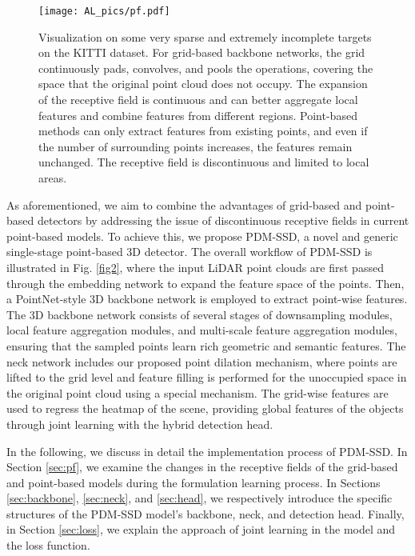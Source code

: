 \begin{figure}[t]
	\begin{center}
		\texttt{[image: AL\_pics/pf.pdf]}
	\end{center}
	\vspace{-0.3cm}
	\caption{Visualization on some very sparse and extremely incomplete targets on the KITTI dataset. For grid-based backbone networks, the grid continuously pads, convolves, and pools the operations, covering the space that the original point cloud does not occupy. The expansion of the receptive field is continuous and can better aggregate local features and combine features from different regions. Point-based methods can only extract features from existing points, and even if the number of surrounding points increases, the features remain unchanged. The receptive field is discontinuous and limited to local areas.}
	\label{fig3}
	\vspace{-0.3cm}
\end{figure}

As aforementioned, we aim to combine the advantages of grid-based and point-based detectors by addressing the issue of discontinuous receptive fields in current point-based models. To achieve this, we propose PDM-SSD, a novel and generic single-stage point-based 3D detector. The overall workflow of PDM-SSD is illustrated in Fig. \ref{fig2}, where the input LiDAR point clouds are first passed through the embedding network to expand the feature space of the points. Then, a PointNet-style 3D backbone network is employed to extract point-wise features. The 3D backbone network consists of several stages of downsampling modules, local feature aggregation modules, and multi-scale feature aggregation modules, ensuring that the sampled points learn rich geometric and semantic features. The neck network includes our proposed point dilation mechanism, where points are lifted to the grid level and feature filling is performed for the unoccupied space in the original point cloud using a special mechanism. The grid-wise features are used to regress the heatmap of the scene, providing global features of the objects through joint learning with the hybrid detection head.

In the following, we discuss in detail the implementation process of PDM-SSD. In Section \ref{sec:pf}, we examine the changes in the receptive fields of the grid-based and point-based models during the formulation learning process. In Sections \ref{sec:backbone}, \ref{sec:neck}, and \ref{sec:head}, we respectively introduce the specific structures of the PDM-SSD model's backbone, neck, and detection head. Finally, in Section \ref{sec:loss}, we explain the approach of joint learning in the model and the loss function.